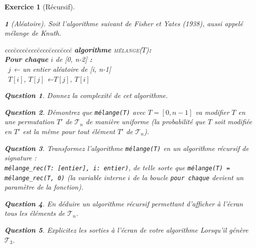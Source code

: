\documentclass{article}
\theoremstyle{exostyle}
\newtheorem{exo}{Exercice}
\theoremstyle{partiestyle}
\newtheorem{partie}{}[exo]
\theoremstyle{questionstyle}
\newtheorem{questionpartie}{Question}[partie]
\begin{document}
\begin{exo}[Récursif]
    \begin{partie}[Aléatoire]
        Soit l'algorithme suivant de Fisher et Yates (1938), aussi appelé {\em mélange de Knuth}.
        \begin{tabbing}
            ccc\=cccc\=cccc\=cccc\=cccc\=cccc\=\kill
            \textbf{algorithme} \textsc{mélange}($T$){\bf :}\\
            \>\textbf{Pour chaque} $i$ de [0, n-2] {\bf :}\\
            \> \>\vline $\,$ $j$ ← un entier aléatoire de [i, n-1] \\
            \> \>\vline $\,$ $T[i]$, $T[j]$ ←$T[j]$, $T[i]$
        \end{tabbing}

        \begin{questionpartie}
            Donnez la complexité de cet algorithme.
        \end{questionpartie}
        \begin{questionpartie}
            Démontrez que \verb|mélange(T)| avec $T=[0, n-1]$ va modifier $T$ en une permutation $T'$ de $\mathcal{T}_n$ de manière uniforme (la probabilité que $T$ soit modifiée en $T'$ est la même pour tout élément $T'$ de $\mathcal{T}_n$).
        \end{questionpartie}
        \begin{questionpartie}
            Transformez l'algorithme \verb|mélange(T)| en un algorithme récursif de signature :\\ \verb|mélange_rec(T: [entier], i: entier)|, de telle sorte que \verb|mélange(T) = mélange_rec(T, 0)| (la variable interne $i$ de la boucle \verb|pour chaque| devient un paramètre de la fonction). 
        \end{questionpartie}
        \begin{questionpartie}
            En déduire un algorithme récursif permettant d'afficher à l'écran tous les éléments de $\mathcal{T}_n$.
        \end{questionpartie}
        \begin{questionpartie}
            Explicitez les sorties à l'écran de votre algorithme Lorsqu'il génère $\mathcal{T}_3$.
        \end{questionpartie}

    \end{partie}
\end{exo}
\end{document}
